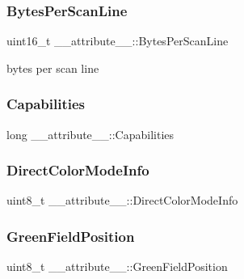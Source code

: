 \subsubsection{\texorpdfstring{Bytes\+Per\+Scan\+Line}{BytesPerScanLine}}
{\footnotesize\ttfamily uint16\+\_\+t \+\_\+\+\_\+attribute\+\_\+\+\_\+\+::\+Bytes\+Per\+Scan\+Line}



bytes per scan line 

\hypertarget{struct____attribute_____a6dc2748c4ab226b9cbf6e7139fa24f74}{}\label{struct____attribute_____a6dc2748c4ab226b9cbf6e7139fa24f74} 
\subsubsection{\texorpdfstring{Capabilities}{Capabilities}}
{\footnotesize\ttfamily long \+\_\+\+\_\+attribute\+\_\+\+\_\+\+::\+Capabilities}

\hypertarget{struct____attribute_____a35fb3e1fc0dc9924bc52977b3a234f9f}{}\label{struct____attribute_____a35fb3e1fc0dc9924bc52977b3a234f9f} 
\subsubsection{\texorpdfstring{Direct\+Color\+Mode\+Info}{DirectColorModeInfo}}
{\footnotesize\ttfamily uint8\+\_\+t \+\_\+\+\_\+attribute\+\_\+\+\_\+\+::\+Direct\+Color\+Mode\+Info}

\hypertarget{struct____attribute_____a44aab7c8026a131654e079837a95ba2b}{}\label{struct____attribute_____a44aab7c8026a131654e079837a95ba2b} 
\subsubsection{\texorpdfstring{Green\+Field\+Position}{GreenFieldPosition}}
{\footnotesize\ttfamily uint8\+\_\+t \+\_\+\+\_\+attribute\+\_\+\+\_\+\+::\+Green\+Field\+Position}

